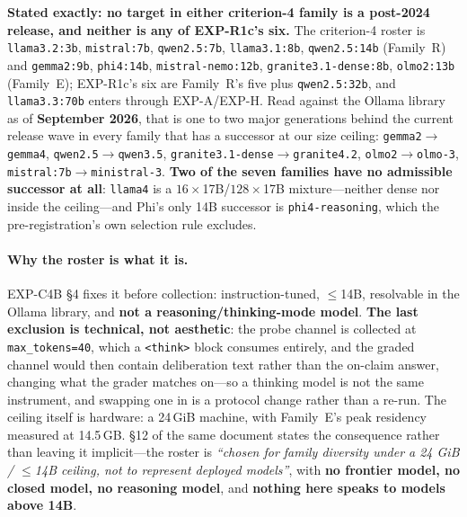\textbf{Stated exactly: no target in either criterion-4 family is a post-2024 release, and neither is any of EXP-R1c's six.} The criterion-4 roster is \texttt{llama3.2:3b}, \texttt{mistral:7b}, \texttt{qwen2.5:7b}, \texttt{llama3.1:8b}, \texttt{qwen2.5:14b} (Family~R) and \texttt{gemma2:9b}, \texttt{phi4:14b}, \texttt{mistral-nemo:12b}, \texttt{granite3.1-dense:8b}, \texttt{olmo2:13b} (Family~E); EXP-R1c's six are Family~R's five plus \texttt{qwen2.5:32b}, and \texttt{llama3.3:70b} enters through EXP-A/EXP-H. Read against the Ollama library as of \textbf{September 2026}, that is one to two major generations behind the current release wave in every family that has a successor at our size ceiling: \texttt{gemma2}$\to$\texttt{gemma4}, \texttt{qwen2.5}$\to$\texttt{qwen3.5}, \texttt{granite3.1-dense}$\to$\texttt{granite4.2}, \texttt{olmo2}$\to$\texttt{olmo-3}, \texttt{mistral:7b}$\to$\texttt{ministral-3}. \textbf{Two of the seven families have no admissible successor at all}: \texttt{llama4} is a $16\times$17B/$128\times$17B mixture---neither dense nor inside the ceiling---and Phi's only 14B successor is \texttt{phi4-reasoning}, which the pre-registration's own selection rule excludes.

\paragraph{Why the roster is what it is.} EXP-C4B §4 fixes it before collection: instruction-tuned, $\leq$14B, resolvable in the Ollama library, and \textbf{not a reasoning/thinking-mode model}. \textbf{The last exclusion is technical, not aesthetic}: the probe channel is collected at \texttt{max\_tokens=40}, which a \texttt{<think>} block consumes entirely, and the graded channel would then contain deliberation text rather than the on-claim answer, changing what the grader matches on---so a thinking model is not the same instrument, and swapping one in is a protocol change rather than a re-run. The ceiling itself is hardware: a 24\,GiB machine, with Family~E's peak residency measured at 14.5\,GB. §12 of the same document states the consequence rather than leaving it implicit---the roster is \emph{``chosen for family diversity under a 24 GiB / $\leq$14B ceiling, not to represent deployed models''}, with \textbf{no frontier model, no closed model, no reasoning model}, and \textbf{nothing here speaks to models above 14B}.

